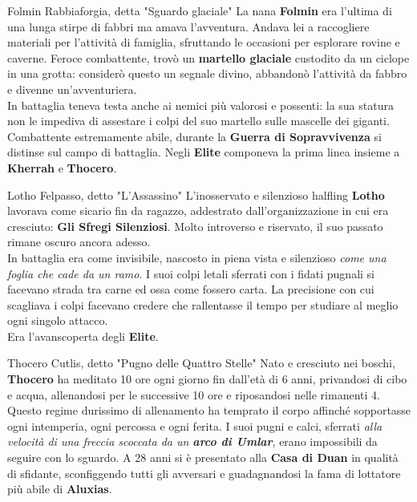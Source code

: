 \documentclass[10pt,twoside,onecolumn,openany]{book}
\begin{document}
\begin{multicols}{2}
\begin{paperbox}{{Folmin Rabbiaforgia, detta "Sguardo glaciale"}}
	La nana \textbf{Folmin} era l'ultima di una lunga stirpe di fabbri ma amava l'avventura. Andava lei a raccogliere materiali per l'attività di famiglia, sfruttando le occasioni per esplorare rovine e caverne. Feroce combattente, trovò un \textbf{martello glaciale} custodito da un ciclope in una grotta: considerò questo un segnale divino, abbandonò l'attività da fabbro e divenne un'avventuriera.\\
	In battaglia teneva testa anche ai nemici più valorosi e possenti: la sua statura non le impediva di assestare i colpi del suo martello sulle mascelle dei giganti. Combattente estremamente abile, durante la \textbf{Guerra di Sopravvivenza} si distinse sul campo di battaglia. Negli \textbf{Elite} componeva la prima linea insieme a \textbf{Kherrah} e \textbf{Thocero}.\\
\end{paperbox}
\begin{paperbox}{{Lotho Felpasso, detto "L'Assassino"}}
	L'inosservato e silenzioso halfling \textbf{Lotho} lavorava come sicario fin da ragazzo, addestrato dall'organizzazione in cui era cresciuto: \textbf{Gli Sfregi Silenziosi}. Molto introverso e riservato, il suo passato rimane oscuro ancora adesso.\\
	In battaglia era come invisibile, nascosto in piena vista e silenzioso \textit{come una foglia che cade da un ramo}. I suoi colpi letali sferrati con i fidati pugnali si facevano strada tra carne ed ossa come fossero carta. La precisione con cui scagliava i colpi facevano credere che rallentasse il tempo per studiare al meglio ogni singolo attacco.\\
	Era l'avanscoperta degli \textbf{Elite}.
\end{paperbox}
\columnbreak
\begin{paperbox}{{Thocero Cutlis, detto "Pugno delle Quattro Stelle"}}
	Nato e cresciuto nei boschi, \textbf{Thocero} ha meditato 10 ore ogni giorno fin dall'età di 6 anni, privandosi di cibo e acqua, allenandosi per le successive 10 ore e riposandosi nelle rimanenti 4. Questo regime durissimo di allenamento ha temprato il corpo affinché sopportasse ogni intemperia, ogni percossa e ogni ferita. I suoi pugni e calci, sferrati \textit{alla velocità di una freccia scoccata da un \textbf{arco di Umlar}}, erano impossibili da seguire con lo sguardo. A 28 anni si è presentato alla \textbf{Casa di Duan} in qualità di sfidante, sconfiggendo tutti gli avversari e guadagnandosi la fama di lottatore più abile di \textbf{Aluxias}.\\

\end{paperbox}
\end{multicols}
\end{document}

